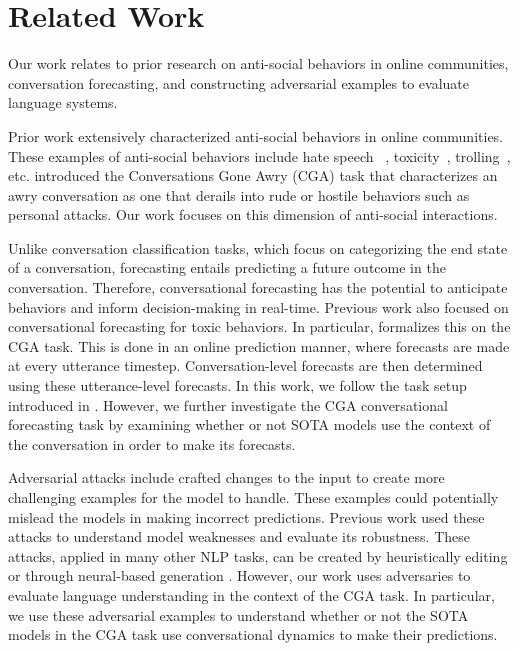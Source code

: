 \section{Related Work}
Our work relates to prior research on anti-social behaviors in online 
communities, conversation forecasting, and constructing adversarial examples
to evaluate language systems.

Prior work extensively characterized anti-social behaviors in online communities.
%
These examples of anti-social behaviors include hate speech ~\citep{rottger-etal-2021-hatecheck, elsherief-etal-2021-latent}, 
toxicity~\citep{pavlopoulos-etal-2020-toxicity, bespalov-etal-2023-towards}, trolling~\citep{mojica-de-la-vega-ng-2018-modeling, lee-etal-2022-elf22}, etc. 
%
\citet{zhang-etal-2018-conversations} introduced the Conversations Gone Awry (CGA)
task that characterizes an awry conversation as one that derails into rude or 
hostile behaviors such as personal attacks. 
%
Our work focuses on this dimension of anti-social interactions.

Unlike conversation classification tasks, which focus on categorizing the end 
state of a conversation, forecasting entails predicting a future outcome in 
the conversation. 
%
Therefore, conversational forecasting has the potential to anticipate behaviors 
and inform decision-making in real-time.
%
Previous work also focused on conversational forecasting for toxic behaviors. 
%
In particular, \citet{chang-danescu-niculescu-mizil-2019-trouble} formalizes this on the CGA 
task. 
%
This is done in an online prediction manner, where forecasts are made at every 
utterance timestep.
%
Conversation-level forecasts are then determined using these utterance-level forecasts.
%
In this work, we follow the task setup introduced in 
\citet{chang-danescu-niculescu-mizil-2019-trouble}.
%
However, we further investigate the CGA conversational forecasting task 
by examining whether or not SOTA models use the context of 
the conversation in order to make its forecasts.


Adversarial attacks include crafted changes to the input to create more challenging
examples for the model to handle.
%
These examples could potentially mislead the models in making incorrect predictions.
%
Previous work used these attacks to understand model weaknesses and evaluate its 
robustness.
%
These attacks, applied in many other NLP tasks,  can be created by heuristically editing \cite{wang-bansal-2018-robust} or through neural-based generation \cite{iyyer-etal-2018-adversarial, khashabi-etal-2020-bang, bartolo-etal-2021-improving, fu-etal-2023-scene}.
%
However, our work uses adversaries to evaluate language understanding in the context of 
the CGA task. 
%
In particular, we use these adversarial examples to understand whether or not the 
SOTA models in the CGA task use conversational dynamics to make their predictions.
